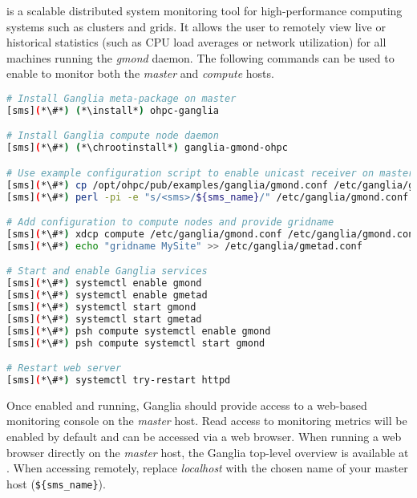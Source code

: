 \Ganglia{} is a scalable distributed system monitoring tool for high-performance
computing systems such as clusters and grids. It allows the user to remotely
view live or historical statistics (such as CPU load averages or network
utilization) for all machines running the {\em gmond} daemon. The following 
commands can be used to enable \Ganglia{} to monitor both the {\em master} and 
{\em compute} hosts.

\begin{lstlisting}[language=bash,keywords={},upquote=true]
# Install Ganglia meta-package on master
[sms](*\#*) (*\install*) ohpc-ganglia

# Install Ganglia compute node daemon
[sms](*\#*) (*\chrootinstall*) ganglia-gmond-ohpc

# Use example configuration script to enable unicast receiver on master host
[sms](*\#*) cp /opt/ohpc/pub/examples/ganglia/gmond.conf /etc/ganglia/gmond.conf
[sms](*\#*) perl -pi -e "s/<sms>/${sms_name}/" /etc/ganglia/gmond.conf

# Add configuration to compute nodes and provide gridname 
[sms](*\#*) xdcp compute /etc/ganglia/gmond.conf /etc/ganglia/gmond.conf
[sms](*\#*) echo "gridname MySite" >> /etc/ganglia/gmetad.conf

# Start and enable Ganglia services
[sms](*\#*) systemctl enable gmond
[sms](*\#*) systemctl enable gmetad
[sms](*\#*) systemctl start gmond
[sms](*\#*) systemctl start gmetad
[sms](*\#*) psh compute systemctl enable gmond
[sms](*\#*) psh compute systemctl start gmond

# Restart web server
[sms](*\#*) systemctl try-restart httpd
\end{lstlisting}

\noindent Once enabled and running, Ganglia should provide access to a web-based
monitoring console on the {\em master} host. Read access to monitoring metrics
will be enabled by default and can be accessed via a web browser. When running
a web browser directly on the {\em master} host, the Ganglia top-level overview
is available
at \href{http://localhost/ganglia}{\color{blue}{http://localhost/ganglia}}.
When accessing remotely, replace {\em localhost} with the chosen name of your
master host (\texttt{\$\{sms\_name\}}).


